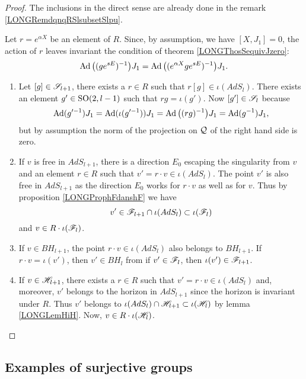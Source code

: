 \begin{proof}
	The inclusions in the direct sense are already done in the remark \ref{LONGRemdqnqRSlsubsetSlpu}.

	Let $r= e^{\alpha X}$ be an element of $R$. Since, by assumption, we have $[X,J_1]=0$, the action of $r$ leaves invariant the condition of theorem \eqref{LONGThosSequivJzero}:
	\begin{equation}		\label{LONGEqalpharjnagitpas}
		\operatorname{Ad}\big( (g e^{sE})^{-1} \big)J_1=\operatorname{Ad}\big( ( e^{\alpha X}g e^{sE})^{-1} \big)J_1.
	\end{equation}
	\begin{enumerate}
		\item
			Let $[g]\in\mathscr{S}_{l+1}$, there exists a $r\in R$ such that $r[g]\in \iota(AdS_l)$. There exists an element $g'\in \operatorname{SO}(2,l-1)$ such that $rg=\iota(g')$. Now $[g']\in\mathscr{S}_l$ because
			\begin{equation}
				\operatorname{Ad}(g'^{-1})J_1=\operatorname{Ad}(\iota(g'^{-1}))J_1=\operatorname{Ad}\big(  (rg)^{-1} \big)J_1=\operatorname{Ad}(g^{-1})J_1,
			\end{equation}
			but by assumption the norm of the projection on $\mathcal{Q}$ of the right hand side is zero.

		\item
			If $v$ is free in $AdS_{l+1}$, there is a direction $E_0$ escaping the singularity from $v$ and an element $r\in R$ such that $v'=r\cdot v\in\iota(AdS_l)$. The point $v'$ is also free in $AdS_{l+1}$ as the direction $E_0$ works for $r\cdot v$ as well as for $v$. Thus by proposition \ref{LONGProphFdanshF} we have
			\begin{equation}
				v'\in\mathscr{F}_{l+1}\cap\iota(AdS_l)\subset\iota(\mathscr{F}_l)
			\end{equation}
			and $v\in R\cdot\iota(\mathscr{F}_l)$.
		\item
			If $v\in BH_{l+1}$, the point $r\cdot v\in\iota(AdS_l)$ also belongs to $BH_{l+1}$. If $r\cdot v=\iota(v')$, then $v'\in BH_l$ from if $v'\in\mathscr{F}_l$, then $\iota(v')\in\mathscr{F}_{l+1}$.
		\item
			If $v\in\mathscr{H}_{l+1}$, there exists a $r\in R$ such that $v'=r\cdot v\in\iota(AdS_l)$ and, moreover, $v'$ belongs to the horizon in $AdS_{l+1}$ since the horizon is invariant under $R$. Thus $v'$ belongs to $\iota(AdS_l)\cap\mathscr{H}_{l+1}\subset \iota(\mathscr{H}_l)$ by lemma \ref{LONGLemHiH}.  Now, $v\in R\cdot\iota(\mathscr{H}_l)$.

	\end{enumerate}
\end{proof}

%
\subsection{Examples of surjective groups}
%

